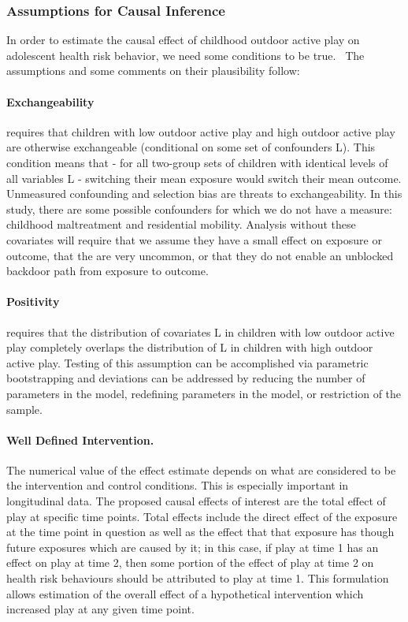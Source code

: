 \documentclass [11pt]{article}
\begin{document}
\subsubsection{Assumptions for Causal Inference}

In order to estimate the causal effect of childhood outdoor active play on adolescent health risk behavior, we need some conditions to be true.~\cite{Hernan_undated-yr} The assumptions and some comments on their plausibility follow: 

\paragraph{Exchangeability} requires that children with low outdoor active play and high outdoor active play are otherwise exchangeable (conditional on some set of confounders L). This condition means that - for all two-group sets of children with identical levels of all variables L -  switching their mean exposure would switch their mean outcome. Unmeasured confounding and selection bias are threats to exchangeability. In this study, there are some possible confounders for which we do not have a measure: childhood maltreatment and residential mobility. Analysis without these covariates will require that we assume they have a small effect on exposure or outcome, that the are very uncommon, or that they do not enable an unblocked backdoor path from exposure to outcome. 

\paragraph{Positivity} requires that the distribution of covariates L in children with low outdoor active play completely overlaps the distribution of L in children with high outdoor active play. Testing of this assumption can be accomplished via parametric bootstrapping and deviations can be addressed by reducing the number of parameters in the model, redefining parameters in the model, or restriction of the sample.~\cite{Petersen2010-co}

\paragraph{Well Defined Intervention.} The numerical value of the effect estimate depends on what are considered to be the intervention and control conditions. This is especially important in longitudinal data. The proposed causal effects of interest are the total effect of play at specific time points. Total effects include the direct effect of the exposure at the time point in question as well as the effect that that exposure has though future exposures which are caused by it; in this case, if play at time 1 has an effect on play at time 2, then some portion of the effect of play at time 2 on health risk behaviours should be attributed to play at time 1. This formulation allows estimation of the overall effect of a hypothetical intervention which increased play at any given time point.
\end{document}

